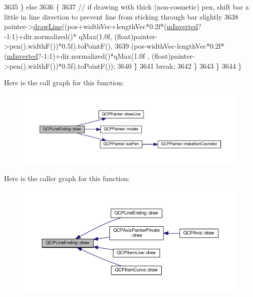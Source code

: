 \begin{DoxyCode}
3635       \} \textcolor{keywordflow}{else}
3636       \{
3637         \textcolor{comment}{// if drawing with thick (non-cosmetic) pen, shift bar a little in line direction to prevent line
       from sticking through bar slightly}
3638         painter->\hyperlink{class_q_c_p_painter_a0b4b1b9bd495e182c731774dc800e6e0}{drawLine}((pos+widthVec+lengthVec*0.2f*(\hyperlink{class_q_c_p_line_ending_a91306fe771d54c955e0af21af14349d5}{mInverted}?-1:1)+dir.normalized()*
      qMax(1.0f, (\textcolor{keywordtype}{float})painter->pen().widthF())*0.5f).toPointF(),
3639                           (pos-widthVec-lengthVec*0.2f*(\hyperlink{class_q_c_p_line_ending_a91306fe771d54c955e0af21af14349d5}{mInverted}?-1:1)+dir.normalized()*qMax(1.0f
      , (\textcolor{keywordtype}{float})painter->pen().widthF())*0.5f).toPointF());
3640       \}
3641       \textcolor{keywordflow}{break};
3642     \}
3643   \}
3644 \}
\end{DoxyCode}


Here is the call graph for this function\+:\nopagebreak
\begin{figure}[H]
\begin{center}
\leavevmode
\includegraphics[width=350pt]{class_q_c_p_line_ending_ac4b2fa94bd27b2f008b5fc090fcd7c0b_cgraph}
\end{center}
\end{figure}




Here is the caller graph for this function\+:\nopagebreak
\begin{figure}[H]
\begin{center}
\leavevmode
\includegraphics[width=350pt]{class_q_c_p_line_ending_ac4b2fa94bd27b2f008b5fc090fcd7c0b_icgraph}
\end{center}
\end{figure}


